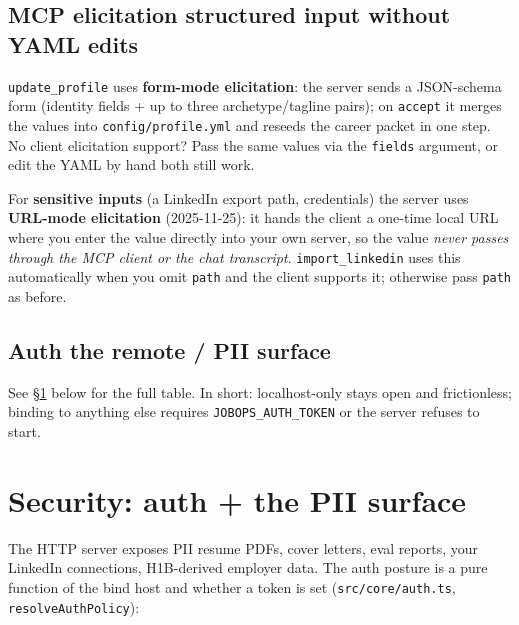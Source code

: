 \documentclass[11pt,letterpaper]{article}
\newcommand{\tool}[1]{\texttt{#1}}
\newcommand{\fpath}[1]{\texttt{#1}}
\begin{document}
\subsection*{MCP elicitation \textemdash{} structured input without YAML edits}

\tool{update\_profile} uses \textbf{form-mode elicitation}: the server sends a JSON-schema form (identity fields + up to three archetype/tagline pairs); on \texttt{accept} it merges the values into \fpath{config/profile.yml} and reseeds the career packet in one step. No client elicitation support? Pass the same values via the \texttt{fields} argument, or edit the YAML by hand \textemdash{} both still work.

For \textbf{sensitive inputs} (a LinkedIn export path, credentials) the server uses \textbf{URL-mode elicitation} (2025-11-25): it hands the client a one-time local URL where you enter the value directly into your own server, so the value \emph{never passes through the MCP client or the chat transcript}. \tool{import\_linkedin} uses this automatically when you omit \texttt{path} and the client supports it; otherwise pass \texttt{path} as before.

\subsection*{Auth \textemdash{} the remote / PII surface}

See \S\ref{sec:security} below for the full table. In short: localhost-only stays open and frictionless; binding to anything else requires \texttt{JOBOPS\_AUTH\_TOKEN} or the server refuses to start.

\section{Security: auth + the PII surface}\label{sec:security}

The HTTP server exposes PII \textemdash{} resume PDFs, cover letters, eval reports, your LinkedIn connections, H1B-derived employer data. The auth posture is a pure function of the bind host and whether a token is set (\fpath{src/core/auth.ts}, \texttt{resolveAuthPolicy}):
\end{document}
